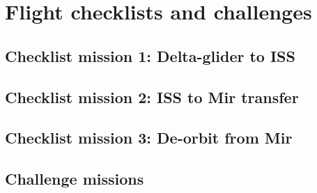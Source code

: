 \documentclass[Orbiter User Manual.tex]{subfiles}
\begin{document}
\section{Flight checklists and challenges}

\subsection{Checklist mission 1: Delta-glider to ISS}

\subsection{Checklist mission 2: ISS to Mir transfer}

\subsection{Checklist mission 3: De-orbit from Mir}

\subsection{Challenge missions}
\end{document}
